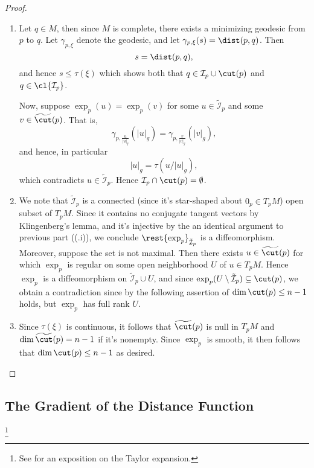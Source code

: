 \begin{proof}
\begin{enumerate}
	\item Let $q\in M$, then since $M$ is complete, there exists a minimizing geodesic from $p$ to $q$.  Let $\gamma_{p,\xi}$ denote the geodesic, and let $\gamma_{p,\xi}(s)=\dist(p,q)$.  Then
		$$s=\dist(p,q),$$
		and hence $s\leq\tau(\xi)$ which shows both that $q\in \mathcal{I}_p\cup\cut(p)$ and $q\in\cl{\mathcal{I}_p}$.
		
		Now, suppose $\exp_p(u)=\exp_p(v)$ for some $u\in\tilde{\mathcal{I}}_p$ and some $v\in\widetilde{\cut}(p)$.  That is,
		$$\gamma_{p,\frac{u}{|u|_g}}(|u|_g)=\gamma_{p,\frac{v}{|v|_g}}(|v|_g),$$
		and hence, in particular
		$$|u|_g=\tau(u/|u|_g),$$
		which contradicts $u\in\tilde{\mathcal{I}}_p$.  Hence $\mathcal{I}_p\cap\cut(p)=\emptyset$.
		
	\item We note that $\tilde{\mathcal{I}}_p$ is a connected (since it's star-shaped about $0_p\in T_pM$) open subset of $T_pM$.  Since it contains no conjugate tangent vectors by Klingenberg's lemma, and it's injective by the an identical argument to previous part ((.i)), we conclude $\rest{\exp_p}_{\tilde{\mathcal{I}}_p}$ is a diffeomorphism.  Moreover, suppose the set is not maximal.  Then there exists $u\in\widetilde{\cut}(p)$ for which $\exp_p$ is regular on some open neighborhood $U$ of $u\in T_pM$.  Hence $\exp_p$ is a diffeomorphism on $\tilde{\mathcal{I}}_p\cup U$, and since $\exp_p(U\setminus\tilde{\mathcal{I}}_p)\subseteq\cut(p)$, we obtain a contradiction since by the following assertion of $\dim{\cut(p)}\leq n-1$ holds, but $\exp_p$ has full rank $U$.
	
	\item Since $\tau(\xi)$ is continuous, it follows that $\widetilde{\cut}(p)$ is null in $T_pM$ and $\dim{\widetilde{\cut}(p)}=n-1$ if it's nonempty.  Since $\exp_p$ is smooth, it then follows that $\dim{\cut(p)}\leq n-1$ as desired.
\end{enumerate}
\end{proof}








\subsection{The Gradient of the Distance Function}\footnote{See \cite{meyer1989toponogov} for an exposition on the Taylor expansion.}

